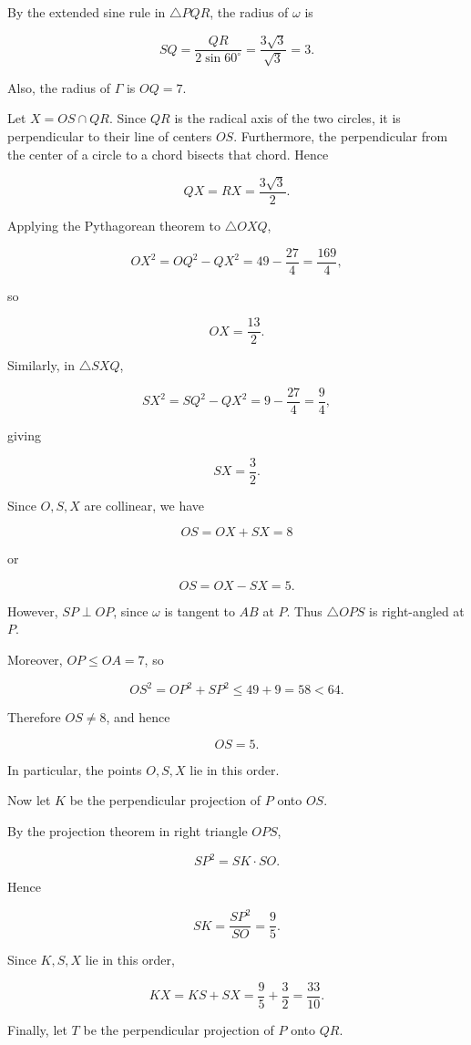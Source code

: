 \begin{enumerate}
 By the extended sine rule in $\triangle PQR$, the radius of $\omega$ is

 
 \[SQ=\frac{QR}{2\sin60^\circ}=\frac{3\sqrt3}{\sqrt3}=3.\]

 Also, the radius of $\Gamma$ is $OQ=7$.

 Let $X=OS\cap QR$. Since $QR$ is the radical axis of the two circles, it is perpendicular to their line of centers $OS$. Furthermore, the perpendicular from the center of a circle to a chord bisects that chord. Hence

 
 \[QX=RX=\frac{3\sqrt3}{2}.\]

 Applying the Pythagorean theorem to $\triangle OXQ$,

 
 \[OX^2=OQ^2-QX^2=49-\frac{27}{4}=\frac{169}{4},\]

 so

 
 \[\boxed{OX=\frac{13}{2}}.\]

 Similarly, in $\triangle SXQ$,

 
 \[SX^2=SQ^2-QX^2=9-\frac{27}{4}=\frac94,\]

 giving

 
 \[\boxed{SX=\frac32}.\]

 Since $O,S,X$ are collinear, we have

 
 \[OS=OX+SX=8\]

 or

 
 \[OS=OX-SX=5.\]

 However, $SP\perp OP$, since $\omega$ is tangent to $AB$ at $P$. Thus $\triangle OPS$ is right-angled at $P$.

 Moreover, $OP\le OA=7$, so

 
 \[OS^2=OP^2+SP^2\le49+9=58<64.\]

 Therefore $OS\ne8$, and hence

 
 \[\boxed{OS=5}.\]

 In particular, the points $O,S,X$ lie in this order.

 Now let $K$ be the perpendicular projection of $P$ onto $OS$.

 By the projection theorem in right triangle $OPS$,

 
 \[SP^2=SK\cdot SO.\]

 Hence

 
 \[SK=\frac{SP^2}{SO}=\frac95.\]

 Since $K,S,X$ lie in this order,

 
 \[KX=KS+SX=\frac95+\frac32=\boxed{\frac{33}{10}}.\]

 Finally, let $T$ be the perpendicular projection of $P$ onto $QR$.


\end{enumerate}
